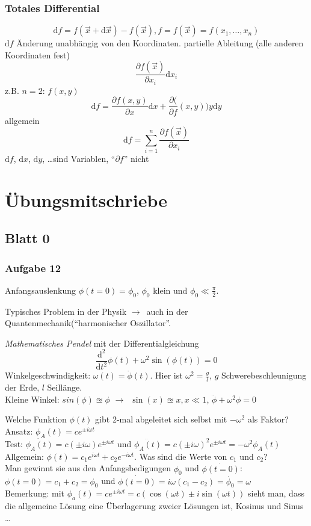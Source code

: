 \documentclass[oneside]{book}
\theoremstyle{definition}
\newcommand{\conseq}{$\rightarrow$~}
\newcommand{\QM}{Quantenmechanik}
\newcommand{\Dgl}{Differentialgleichung}
\renewcommand{\d}{\mathrm d}
\newcommand{\ffpartial}[2]{\frac{\partial #1}{\partial #2}}
\begin{document}
\subsection{Totales Differential}
$$\d f = f(\vec{x} + \d \vec{x}) - f(\vec{x}), f = f(\vec{x}) = f(x_1, \dots, x_n)$$
$\d f$ Änderung unabhängig von den Koordinaten.
partielle Ableitung (alle anderen Koordinaten fest)
$$\ffpartial{f(\vec{x})}{x_i} \d x_i$$
z.B. $n = 2$: $f (x, y)$
$$\d f = \ffpartial{f(x,y)}{x} \d x + \ffpartial(f(x,y)){y} \d y$$
allgemein
$$\d f = \sum_{i=1}^n \ffpartial{f(\vec{x})}{x_i}$$
$\d f$, $\d x$, $\d y$, \dots sind Variablen, "`$\partial f$"' nicht

\chapter{Übungsmitschriebe}

\section{Blatt 0}
\subsection{Aufgabe 12}
Anfangsauslenkung $\phi(t = 0) = \phi_0$, $\phi_0$ klein und $\phi_0 \ll \frac{\pi}{2}$.

Typisches Problem in der Physik \conseq auch in der \QM ("`harmonischer Oszillator"'.
 
\textit{Mathematisches Pendel} mit der \Dgl
$$ \frac{\d^2}{\d t^2} \phi(t) + \omega^2 \sin(\phi(t)) = 0$$
Winkelgeschwindigkeit: $\omega(t) = \dot\phi(t)$. Hier ist $\omega^2 = \frac{g}{l}$, $g$ Schwerebeschleunigung der Erde, $l$ Seillänge.\\
Kleine Winkel: $sin(\phi) \approxeq \phi$ \conseq $\sin(x) \approxeq x, x \ll 1$, $\ddot{\phi} + \omega^2 \phi = 0$

Welche Funktion $\phi(t)$ gibt 2-mal abgeleitet sich selbst mit $-\omega^2$ als Faktor?\\
Ansatz: $\phi_A(t) = c e^{\pm i \omega t}$\\
Test: $\dot{\phi_A(t)} = c (\pm i \omega) e^{\pm i \omega t}$ und $\ddot{\phi_A(t)} = c (\pm i \omega)^2 e^{\pm i \omega t} = - \omega^2 \phi_A(t)$\\
Allgemein: $\phi(t) = c_1 e^{i \omega t} + c_2 e^{- i \omega t}$. Was sind die Werte von $c_1$ und $c_2$?\\
Man gewinnt sie aus den Anfangsbedigungen $\phi_0$ und $\dot{\phi(t = 0)}$: $\phi(t = 0) = c_1 + c_2 = \phi_0$ und $\dot{\phi(t = 0)} = i \omega (c_1 - c_2) = \dot{\phi_0} = \omega$\\
Bemerkung: mit $\phi_a(t) = c e^{\pm i \omega t} = c (\cos(\omega t) \pm i \sin(\omega t))$ sieht man, dass die allgemeine Lösung eine Überlagerung zweier Lösungen ist, Kosinus und Sinus \dots
\end{document}
